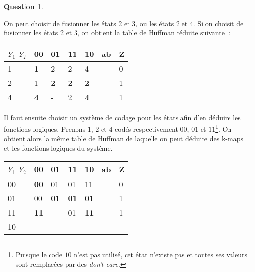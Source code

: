 \documentclass[11pt,a4paper,dvipsnames,]{article}
\theoremstyle{definition}%
\newtheorem{Q}{Question}[] %
\begin{document}
\begin{Q}
{\begin{enumerate}
		On peut choisir de fusionner les états 2 et 3, ou les états 2 et 4.
		Si on choisit de fusionner les états 2 et 3, on obtient la table de Huffman réduite suivante~:
		\begin{center}
			\begin{tabular}{|l|l|l|l|l|l|l|}
			\hline
			$Y_1$ $Y_2$ & 00         & 01         & 11         & 10         & ab & Z \\ \hline
			1           & \textbf{1} & 2          & 2          & 4          &    & 0 \\ \cline{1-5} \cline{7-7}
			2           & 1          & \textbf{2} & \textbf{2} & \textbf{2} &    & 1 \\ \cline{1-5} \cline{7-7}
			4           & \textbf{4} & -          & 2          & \textbf{4} &    & 1 \\ \cline{1-5} \cline{7-7}
			\end{tabular}
		\end{center}

		Il faut ensuite choisir un système de codage pour les états afin d'en déduire les fonctions logiques.
		Prenons $1$, $2$ et $4$ codés respectivement $00$, $01$ et $11$\footnote{Puisque le code $10$ n'est pas utilisé, cet état n'existe pas et toutes ses valeurs sont remplacées par des \textit{don't care}.}.
		On obtient alors la même table de Huffman de laquelle on peut déduire des k-maps et les fonctions logiques du système.

		\begin{center}
			\begin{tabular}{|l|l|l|l|l|l|l|}
			\hline
			$Y_1$ $Y_2$ & 00         & 01         & 11         & 10         & ab & Z \\ \hline
			00           & \textbf{00} & 01          & 01          & 11          &    & 0 \\ \cline{1-5} \cline{7-7}
			01           & 00          & \textbf{01} & \textbf{01} & \textbf{01} &    & 1 \\ \cline{1-5} \cline{7-7}
			11           & \textbf{11} & -          & 01          & \textbf{11} &    & 1 \\ \cline{1-5} \cline{7-7}
			10           & -           & -          & -           & -           &    & - \\ \cline{1-5} \cline{7-7}
			\end{tabular}



\end{center}
\end{enumerate}}
\end{Q}
\end{document}
